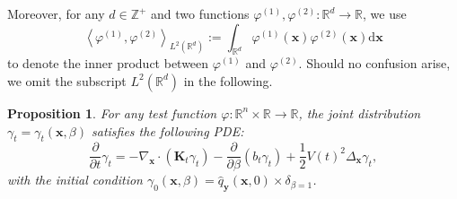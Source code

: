 \documentclass{article}
\numberwithin{equation}{section}
\newtheorem{proposition}[theorem]{Proposition}
\newcommand{\dif}{{\mathrm{d}}}
\def\vx{{\bm{x}}}
\def\vy{{\bm{y}}}
\def\mK{{\bm{K}}}
\newcommand{\R}{\mathbb{R}}
\begin{document}
Moreover, for any $d \in \mathbb{Z}^{+}$ and two functions $\varphi^{(1)},\varphi^{(2)}:\mathbb{R}^{d} \rightarrow \mathbb{R}$, we use 
$$\left\langle\varphi^{(1)},\varphi^{(2)}\right\rangle_{L^2(\mathbb{R}^d)}:= \int_{\mathbb{R}^d}\varphi^{(1)}(\vx)\varphi^{(2)}(\vx)\dif\vx$$
to denote the inner product between $\varphi^{(1)}$ and $\varphi^{(2)}$. Should no confusion arise, we omit the subscript $L^2(\R^d)$ in the following.


\begin{proposition}
    For any test function $\varphi: \mathbb{R}^n \times \mathbb{R} \rightarrow \mathbb{R}$, the joint distribution $\gamma_t = \gamma_t(\vx, \beta)$ satisfies the following PDE:
    \begin{equation}
        \frac{\partial}{\partial t}\gamma_t = -\nabla_{\vx} \cdot \left(\mK_{t}\gamma_t\right) - \frac{\partial}{\partial \beta}\left(b_t \gamma_t\right)+\frac{1}{2}V(t)^2\Delta_{\vx}\gamma_t,
        \label{eqn: weak form of joint PDE}
    \end{equation}
    with the initial condition $\gamma_0(\vx,\beta) =\widehat{q}_{\vy}(\vx,0) \times \delta_{\beta = 1}$.
\end{proposition}
\end{document}
